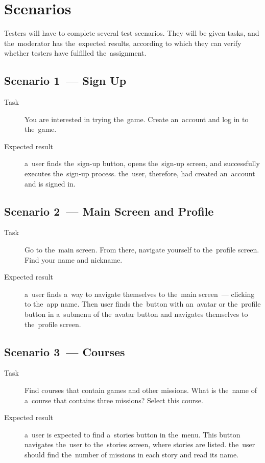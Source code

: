 \section{Scenarios}

Testers will have to complete several test scenarios.
They will be given tasks, and the~moderator has the~expected results, according to which they can verify whether testers have fulfilled the~assignment.

\pagebreak

\subsection*{Scenario 1~--- Sign Up}

\begin{description}
    \item[Task] You are interested in trying the~game.
    Create an~account and log in to the~game.
    \item[Expected result] a~user finds the~sign-up button, opens the~sign-up screen, and successfully executes the~sign-up process.
    the~user, therefore, had created an~account and is signed in.
\end{description}

\subsection*{Scenario 2~--- Main Screen and Profile}

\begin{description}
    \item[Task] Go to the~main screen.
    From there, navigate yourself to the~profile screen.
    Find your name and nickname.
    \item[Expected result] a~user finds a~way to navigate themselves to the~main screen~--- clicking to the~app name.
    Then user finds the~button with an~avatar or the~profile button in a~submenu of the~avatar button and navigates themselves to the~profile screen.
\end{description}

\subsection*{Scenario 3~--- Courses}

\begin{description}
    \item[Task] Find courses that contain games and other missions.
    What is the~name of a~course that contains three missions?
    Select this course.
    \item[Expected result] a~user is expected to find a~stories button in the~menu.
    This button navigates the~user to the~stories screen, where stories are listed.
    the~user should find the~number of missions in each story and read its name.
\end{description}

